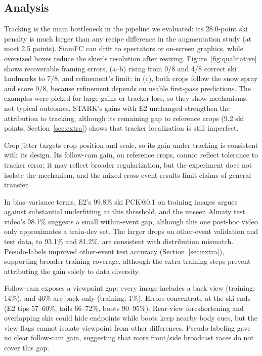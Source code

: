 \documentclass{article}
\begin{document}
\subsection{Analysis}
Tracking is the main bottleneck in the pipeline we evaluated: its 28.0-point ski penalty is much larger than any
recipe difference in the augmentation study (at most 2.5 points).
SiamFC can drift to spectators or on-screen graphics, while oversized boxes reduce the skier's resolution after
resizing. Figure~\ref{fig:qualitative} shows recoverable framing errors, (a--b) rising from 0/8 and 4/8 correct ski
landmarks to 7/8, and refinement's limit: in (c), both crops follow the snow spray and score 0/8, because refinement
depends on usable first-pass predictions. The examples were picked for large gains or tracker loss, so they show
mechanisms, not typical outcomes. STARK's
gains with E2 unchanged strengthen the attribution to tracking, although its remaining gap to reference crops (9.2 ski
points; Section~\ref{sec:extra}) shows that tracker localization is still imperfect.

Crop jitter targets crop position and scale, so its gain under tracking is consistent with its design. Its
follow-cam gain, on reference crops, cannot reflect tolerance to tracker error; it may reflect broader regularization,
but the experiment does not isolate the mechanism, and the mixed cross-event results limit claims of general transfer.

In bias--variance terms, E2's 99.8\% ski PCK@0.1 on training images argues against substantial underfitting at this
threshold, and the unseen Almaty test video's 98.1\% suggests a small within-event gap, although this one post-hoc
video only approximates a train-dev set. The larger drops on other-event validation and test data, to 93.1\% and
81.2\%, are consistent with distribution mismatch. Pseudo-labels improved other-event test accuracy
(Section~\ref{sec:extra}), supporting broader training coverage, although the extra training steps prevent
attributing the gain solely to data diversity.

Follow-cam exposes a viewpoint gap: every image includes a back view (training: 14\%), and 46\% are back-only
(training: 1\%). Errors concentrate at the ski ends (E2 tips 57--60\%, tails 66--72\%, boots 90--95\%). Rear-view
foreshortening and overlapping skis could hide endpoints while boots keep nearby body cues, but the view flags cannot
isolate viewpoint from other differences. Pseudo-labeling gave no clear follow-cam gain, suggesting that more
front/side broadcast races do not cover this gap.
\end{document}

